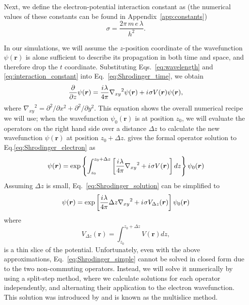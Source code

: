 \documentclass[%
 superscriptaddress,
 aip,
 amsmath,amssymb,
preprint,%
 author-year,%
longbibliography
]{revtex4-2}
\newcommand{\ii}{{i\mkern1mu}}
\begin{document}
Next, we define the electron-potential interaction constant as (the numerical values of these constants can be found in Appendix~\ref{app:constants})
\begin{equation}
    \sigma = \frac{2 \pi \, m \, e \, \lambda}{h^2}.
    \label{eq:interaction_constant}
\end{equation}

In our simulations, we will assume the $z$-position coordinate of the wavefunction $\psi(\bm{r})$ is alone sufficient to describe its propagation in both time and space, and therefore drop the $t$ coordinate. Substituting Eqs.~\ref{eq:wavelength} and \ref{eq:interaction_constant} into Eq.~\ref{eq:Shrodinger_time}, we obtain \citep{kirkland2020}
\begin{equation}
    \frac{\partial }{\partial z} \psi(\bm{r})
    =
    \frac{\ii \lambda}{4 \pi} {\nabla_{xy}}^2 \psi(\bm{r})
    + 
    \ii \sigma V(\bm{r}) \psi(\bm{r}),
    \label{eq:Shrodinger_electron}
\end{equation}
where ${\nabla_{xy}}^2 = \partial^2/\partial x^2 + \partial^2/\partial y^2$. This equation shows the overall numerical recipe we will use; when the wavefunction $\psi_0(\bm{r})$ is at position $z_0$, we will evaluate the operators on the right hand side over a distance $\Delta z$ to calculate the new wavefunction $\psi(\bm{r})$ at position $z_0 + \Delta z$. \cite{kirkland2020} gives the formal operator solution to Eq.\ref{eq:Shrodinger_electron} as
\begin{equation}
    \psi(\bm{r})
    = 
    \exp \left\{
    \int_{z_0}^{z_0 + \Delta z} 
    \left[
        \frac{\ii \lambda}{4 \pi} {\nabla_{xy}}^2
        + 
        \ii \sigma V(\bm{r})
    \right] dz
    \right\}
    \psi_0(\bm{r})
    \label{eq:Shrodinger_solution}
\end{equation}
Assuming $\Delta z$ is small, Eq.~\ref{eq:Shrodinger_solution} can be simplified to
\begin{equation}
    \psi(\bm{r})
    = 
    \exp\left[
        \frac{\ii \lambda}{4 \pi} \Delta z {\nabla_{xy}}^2
        + 
        \ii \sigma V_{\Delta z}(\bm{r})
    \right]
    \psi_0(\bm{r})
    \label{eq:Shrodinger_simple}
\end{equation}
where
\begin{equation}
    V_{\Delta z}(\bm{r})
    =
    \int_{z_0}^{z_0 + \Delta z} 
    V(\bm{r}) dz,
\end{equation}
is a thin slice of the potential. Unfortunately, even with the above approximations, Eq.~\ref{eq:Shrodinger_simple} cannot be solved in closed form due to the two non-commuting operators. Instead, we will solve it numerically by using a split-step method, where we calculate solutions for each operator independently, and alternating their application  to the electron wavefunction. This solution was introduced by \cite{cowley1957scattering} and is known as the multislice method.
\end{document}
